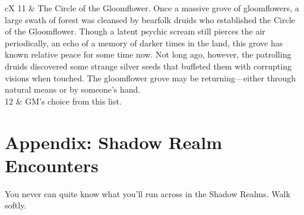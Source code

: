 \documentclass[10pt,a4paper,twoside,bg=print,twocolumn,openany,nodeprecatedcode]{dndbook}
\begin{document}
\begin{DndTable}[header=Lore of the Bearfolk Druids]{cX}
11 & The Circle of the Gloomflower. Once a massive grove of gloomflowers, a large swath of forest was cleansed by bearfolk druids who established the Circle of the Gloomflower. Though a latent psychic scream still pierces the air periodically, an echo of a memory of darker times in the land, this grove has known relative peace for some time now. Not long ago, however, the patrolling druids discovered some strange silver seeds that buffeted them with corrupting visions when touched. The gloomflower grove may be returning—either through natural means or by someone's hand.\\
12 & GM's choice from this list.\\
\end{DndTable}

\chapter{Appendix: Shadow Realm Encounters}
You never can quite know what you'll run across in the Shadow Realms. Walk softly.
\end{document}
